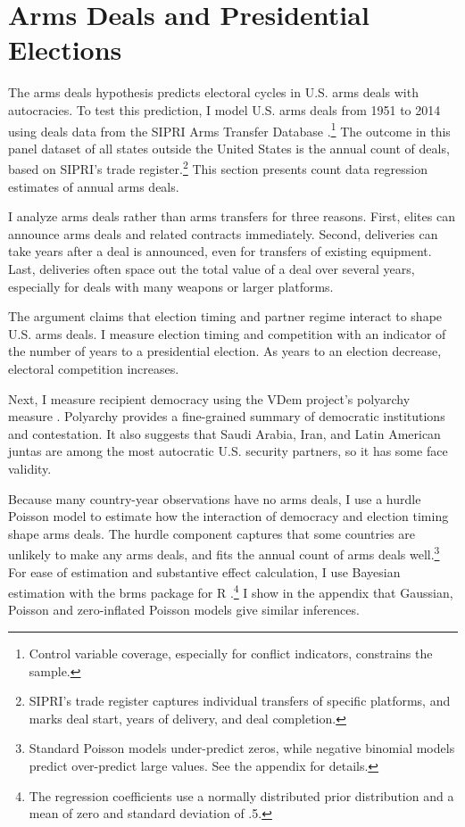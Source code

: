 \documentclass[12pt]{article}
\begin{document}
\section{Arms Deals and Presidential Elections}


The arms deals hypothesis predicts electoral cycles in U.S. arms deals with autocracies.
To test this prediction, I model U.S. arms deals from 1951 to 2014 using deals data from the SIPRI Arms Transfer Database \citep{SIPRI2021}.\footnote{Control variable coverage, especially for conflict indicators, constrains the sample.}
The outcome in this panel dataset of all states outside the United States is the annual count of deals, based on SIPRI's trade register.\footnote{SIPRI's trade register captures individual transfers of specific platforms, and marks deal start, years of delivery, and deal completion.}
This section presents count data regression estimates of annual arms deals. 


I analyze arms deals rather than arms transfers for three reasons.
First, elites can announce arms deals and related contracts immediately. 
Second, deliveries can take years after a deal is announced, even for transfers of existing equipment. 
Last, deliveries often space out the total value of a deal over several years, especially for deals with many weapons or larger platforms. 


The argument claims that election timing and partner regime interact to shape U.S. arms deals. 
I measure election timing and competition with an indicator of the number of years to a presidential election. 
As years to an election decrease, electoral competition increases. 


Next, I measure recipient democracy using the VDem project's polyarchy measure \citep{Coppedgeetal2008}. 
Polyarchy provides a fine-grained summary of democratic institutions and contestation.
It also suggests that Saudi Arabia, Iran, and Latin American juntas are among the most autocratic U.S. security partners, so it has some face validity.  


Because many country-year observations have no arms deals, I use a hurdle Poisson model to estimate how the interaction of democracy and election timing shape arms deals.
The hurdle component captures that some countries are unlikely to make any arms deals, and fits the annual count of arms deals well.\footnote{Standard Poisson models under-predict zeros, while negative binomial models predict over-predict large values. See the appendix for details.} 
For ease of estimation and substantive effect calculation, I use Bayesian estimation with the brms package for \textsf{R} \citep{Buerkner2017}.\footnote{The regression coefficients use a normally distributed prior distribution and a mean of zero and standard deviation of .5.}
I show in the appendix that Gaussian, Poisson and zero-inflated Poisson models give similar inferences. 
\end{document}
